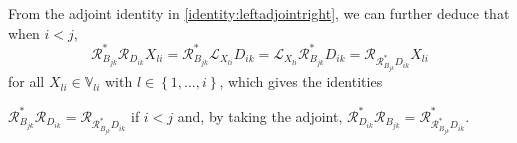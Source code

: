 \documentclass[oneside]{amsart}
\theoremstyle{plain}
\theoremstyle{definition}
\theoremstyle{remark}
\numberwithin{equation}{section}
\begin{document}
From the adjoint identity in \ref{identity:leftadjointright}, we can
further deduce that when $i < j$,
\[
\mathcal{R}^{*}_{B_{jk}} \mathcal{R}_{D_{ik}} X_{li}
%
= \mathcal{R}^{*}_{B_{jk}} \mathcal{L}_{X_{li}} D_{ik}
%
= \mathcal{L}_{X_{li}} \mathcal{R}^{*}_{B_{jk}} D_{ik}
%
= \mathcal{R}_{\mathcal{R}^{*}_{B_{jk}} D_{ik}} X_{li}
\]
for all $X_{li} \in \mathbb{V}_{li}$ with $l \in \left\{1, \dotsc,
i\right\}$, which gives the identities
\begin{enumerate}[label={[\Alph*]},
ref={[\Alph*]}]
\addtocounter{enumi}{5}%
\item\label{identity:rightadjointright}%
$\mathcal{R}^{*}_{B_{jk}} \mathcal{R}_{D_{ik}} =
\mathcal{R}_{\mathcal{R}^{*}_{B_{jk}} D_{ik}}$ if $i < j$ and, by taking
the adjoint, $\mathcal{R}^{*}_{D_{ik}} \mathcal{R}_{B_{jk}} =
\mathcal{R}^{*}_{\mathcal{R}^{*}_{B_{jk}} D_{ik}}$.

\end{enumerate}
\end{document}
